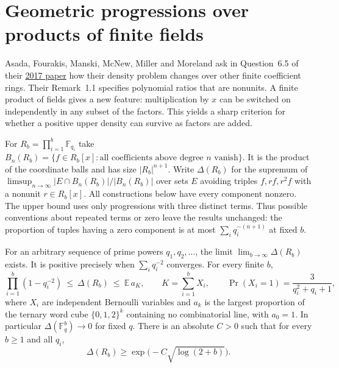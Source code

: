 \section{Geometric progressions over products of finite fields}
\label{sec:products}
Asada, Fourakis, Manski, McNew, Miller and Moreland ask in Question~6.5
of their \href{https://doi.org/10.1016/j.ffa.2016.10.002}{2017 paper}
how their density problem changes over other finite coefficient rings.
Their Remark~1.1 specifies polynomial ratios that are nonunits.
A finite product of fields gives a new feature: multiplication by $x$ can be
switched on independently in any subset of the factors. This yields a sharp
criterion for whether a positive upper density can survive as factors are added.

For $R_b=\prod_{i=1}^b\mathbb F_{q_i}$ take
$B_n(R_b)=\{f\in R_b[x]:\text{all coefficients above degree }n\text{ vanish}\}$.
It is the product of the coordinate balls and has size $|R_b|^{n+1}$.
Write $\Delta(R_b)$ for the supremum of
$\limsup_{n\to\infty}|E\cap B_n(R_b)|/|B_n(R_b)|$ over sets $E$
avoiding triples $f,rf,r^2f$ with a nonunit $r\in R_b[x]$.
All constructions below have every component nonzero. The upper bound
uses only progressions with three distinct terms. Thus possible conventions
about repeated terms or zero leave the results unchanged: the proportion of
tuples having a zero component is at most $\sum_i q_i^{-(n+1)}$ at fixed $b$.

\begin{theorem}\label{thm:products}
For an arbitrary sequence of prime powers $q_1,q_2,\ldots$, the limit
$\lim_{b\to\infty}\Delta(R_b)$ exists. It is positive precisely when
$\sum_i q_i^{-2}$ converges. For every finite $b$,
\[
 \prod_{i=1}^b(1-q_i^{-2})\ \le\ \Delta(R_b)
 \ \le\ \mathbb E\, a_K,\qquad
 K=\sum_{i=1}^b X_i,\qquad
 \Pr(X_i=1)=\frac{3}{q_i^2+q_i+1},
\]
where $X_i$ are independent Bernoulli variables and $a_k$ is the largest
proportion of the ternary word cube $\{0,1,2\}^k$ containing no
combinatorial line, with $a_0=1$. In particular $\Delta(\mathbb F_q^b)\to0$
for fixed $q$. There is an absolute $C>0$ such that for every $b\ge1$
and all $q_i$,
\[
 \Delta(R_b)\ge \exp\!\big(-C\sqrt{\log(2+b)}\big).
\]
\end{theorem}

